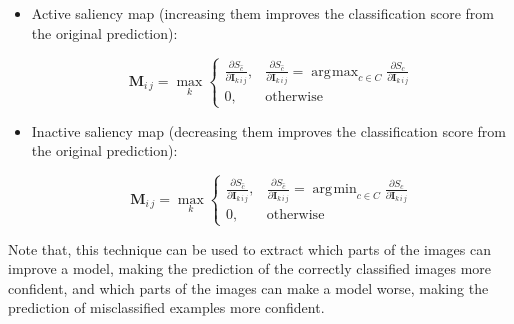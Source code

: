 \documentclass[preprint,12pt]{elsarticle}
\DeclareMathOperator*{\argmax}{arg\!max}
\DeclareMathOperator*{\argmin}{arg\!min}
\begin{document}
\begin{itemize}
    \item Active saliency map (increasing them improves the classification score from the original prediction):
    
    \begin{equation}
      \boldsymbol{M}_{i\, j} = \max_{k}
        \begin{cases}
            \frac{\partial S_{\hat{c}}}{\partial \boldsymbol{I}_{k\, i\, j}}, & \frac{\partial S_{\hat{c}}}{\partial \boldsymbol{I}_{k\, i\, j}} = \argmax_{c \in C}\frac{\partial S_{c}}{\partial \boldsymbol{I}_{k\, i\, j}} \\
            0, & \text{otherwise}
        \end{cases}
        \label{eq: active saliency map}
    \end{equation}

    \item Inactive saliency map (decreasing them improves the classification score from the original prediction):
    
    \begin{equation}
      \boldsymbol{M}_{i\, j} = \max_{k}
        \begin{cases}
            \frac{\partial S_{\hat{c}}}{\partial \boldsymbol{I}_{k\, i\, j}}, & \frac{\partial S_{\hat{c}}}{\partial \boldsymbol{I}_{k\, i\, j}} = \argmin_{c \in C}\frac{\partial S_{c}}{\partial \boldsymbol{I}_{k\, i\, j}} \\
            0, & \text{otherwise}
        \end{cases}
        \label{eq: inactive saliency map}
    \end{equation}

\end{itemize}

Note that, this technique can be used to extract which parts of the images can improve a model, making the prediction of the correctly classified images more confident, and which parts of the images can make a model worse, making the prediction of misclassified examples more confident.
\end{document}
